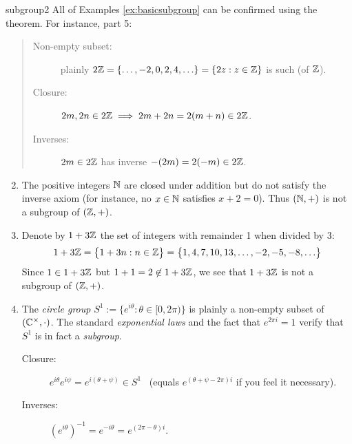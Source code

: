 
\begin{examples}{}{subgroup2}
	\exstart All of Examples \ref{ex:basicsubgroup} can be confirmed using the theorem. For instance, part 5:
	\begin{quote}
		\begin{description}
			\item[Non-empty subset:] plainly $2\mathbb{Z}=\{\ldots,-2,0,2,4,\ldots\}=\{2z:z\in\mathbb{Z}\}$ is such (of $\mathbb{Z}$).
			\item[Closure:] $2m,2n\in 2\mathbb{Z}\implies 2m+2n=2(m+n)\in 2\mathbb{Z}$.
			\item[Inverses:] $2m\in 2\mathbb{Z}$ has inverse $-(2m)=2(-m)\in 2\mathbb{Z}$.
		\end{description}
	\end{quote}
	
	\begin{enumerate}\setcounter{enumi}{1}
	  \item The positive integers $\mathbb{N}$ are closed under addition but do not satisfy the  inverse axiom (for instance, no $x\in\mathbb{N}$ satisfies $x+2=0$). Thus $(\mathbb{N},+)$ is not a subgroup of $(\mathbb{Z},+)$.
	
		\goodbreak
	
		\item\label{intro:modex} Denote by $1+3\mathbb{Z}$ the set of integers with remainder 1 when divided by 3:
		\[
			1+3\mathbb{Z} =\bigl\{1+3n:n\in\mathbb{Z}\bigr\}
			=\bigl\{1,4,7,10,13,\ldots, -2,-5,-8,\ldots\bigr\}
		\]
		Since $1\in 1+3\mathbb{Z}$ but $1+1=2\not\in 1+3\mathbb{Z}$, we see that $1+3\mathbb{Z}$ is not a subgroup of $(\mathbb{Z},+)$.
		
	    
	  \item\label{ex:circlegroup} The \emph{circle group} $S^1:=\bigl\{e^{i\theta}:\theta\in[0,2\pi)\bigr\}$ is plainly a non-empty subset of $(\mathbb{C}^\times,\cdot)$. The standard \emph{exponential laws} and the fact that $e^{2\pi i}=1$ verify that $S^1$ is in fact a \emph{subgroup}.
		\begin{description}
			\item[Closure:] $e^{i\theta}e^{i\psi}=e^{i(\theta+\psi)} \in S^1$ \ (equals $e^{(\theta+\psi-2\pi) i}$ if you feel it necessary).
			\item[Inverses:] $(e^{i\theta})^{-1}=e^{-i\theta}=e^{(2\pi -\theta)i}$.
		\end{description}
	\end{enumerate}
\end{examples}


